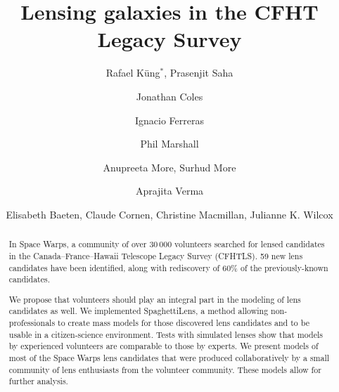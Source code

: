 \documentclass{ws-procs975x65}
\newcommand{\spl}{SpaghettiLens\xspace}
\newcommand{\sw}{Space Warps\xspace}
\newcommand{\scite}[1]{\cite{#1}}          %
\begin{document}
\title{Lensing galaxies in the CFHT Legacy Survey}

\author{ Rafael K\"ung$^*$, Prasenjit Saha }
\address{
  Physik-Institut, University of Zurich,\\
  Winterthurerstrasse 190, 8057 Zurich, Switzerland\\
  $^*$E-mail: rafael\_kueng@uzh.ch
}

\author{ Jonathan Coles }
\address{
  Exascale Research Computing Lab, Campus Teratec,\\
  2 Rue de la Piquetterie, 91680 Bruyeres-le-Chatel, France
}

\author{ Ignacio Ferreras }
\address{
  Mullard Space Science Laboratory, University College London, Holmbury St Mary, Dorking, Surrey RH5 6NT, UK
}

\author{ Phil Marshall }
\address{
  Kavli Institute for Particle Astrophysics and Cosmology, Stanford University\\
  452 Lomita Mall, Stanford, CA 94035, USA
}

\author{ Anupreeta More, Surhud More }
\address{
  Kavli Institute for the Physics and Mathematics of the Universe, University of Tokyo\\ 5-1-5 Kashiwanoha, Kashiwa-shi 277-8583, Japan
}

\author{ Aprajita Verma }
\address{
  Sub-department of Astrophysics, University of Oxford, Denys Wilkinson Building\\
  Keble Road, Oxford, OX1 3RH, UK
}

\author{ Elisabeth Baeten, Claude Cornen, Christine Macmillan, Julianne K. Wilcox }
\address{
  Zooniverse, c/o Astrophysics Department, University of Oxford\\
  Oxford OX1 3RH, UK
}





\begin{abstract}
In \sw, a community of over 30\,000 %
volunteers searched for lensed candidates in the Canada--France--Hawaii Telescope Legacy Survey (CFHTLS).
59 new lens candidates have been identified, along with rediscovery of 60\% of the previously-known candidates.\scite{sw2}

We propose that volunteers should play an integral part in the modeling of lens candidates as well.
We implemented \spl, a method allowing non-professionals to create mass models for those discovered lens candidates and to be usable in a citizen-science environment.
Tests with simulated lenses show that models by experienced volunteers are comparable to those by experts.\scite{Kueng2015}
We present models of most of the \sw lens candidates that were produced collaboratively by a small community of lens enthusiasts from the volunteer community.
These models allow for further analysis.
\end{abstract}
\end{document}
